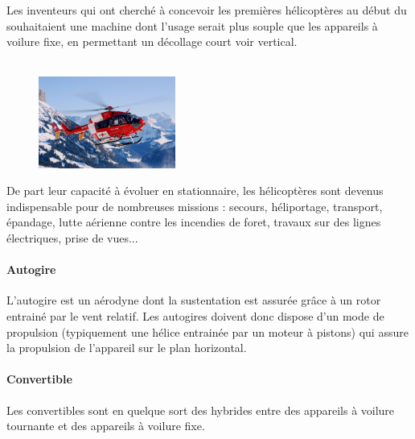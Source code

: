 		Les inventeurs qui ont cherché à concevoir les premières hélicoptères au début du  souhaitaient une machine dont l'usage serait plus souple que les appareils à voilure fixe, en permettant un décollage court voir vertical. \\
		
		\\
		
	\begin{figure}[H]
  	\centering
    \includegraphics[width=0.4\textwidth]{01-EtudeAeronefs/img/helicoptereEC145.jpg}
	\end{figure}	
		
		De part leur capacité à évoluer en stationnaire, les hélicoptères sont devenus indispensable pour de nombreuses missions : secours, héliportage, transport, épandage, lutte aérienne contre les incendies de foret, travaux sur des lignes électriques, prise de vues...
		
		\paragraph{Autogire}
		L'autogire  est un aérodyne dont la sustentation est assurée grâce à un rotor entrainé par le vent relatif. Les autogires doivent donc dispose d'un mode de propulsion (typiquement une hélice entrainée par un moteur à pistons) qui assure la propulsion de l'appareil sur le plan horizontal.
		
		
		\paragraph{Convertible}
		Les convertibles  sont en quelque sort des hybrides entre des appareils à voilure tournante et des appareils à voilure fixe.
		
